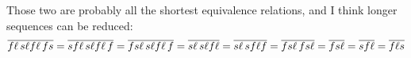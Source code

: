 \begin{description}
Those two are probably all the shortest equivalence relations, and I think longer sequences can be reduced:
\[
{\overline{f\ell\,s\ell f \ell\,fs}}
    = {\overline{sf\ell\,s\ell f \ell\,f}}
    = {\overline{fs\ell\,s\ell f \ell\,f}}
    = {\overline{s\ell\,s\ell f \ell}}
    = {\overline{s\ell\,s f \ell f}}
    = {\overline{f s\ell\,f s \ell}}
    = {\overline{f s\ell}}
    = {\overline{s f\ell}}
    = {\overline{f\ell s}}
\]

\end{description}

